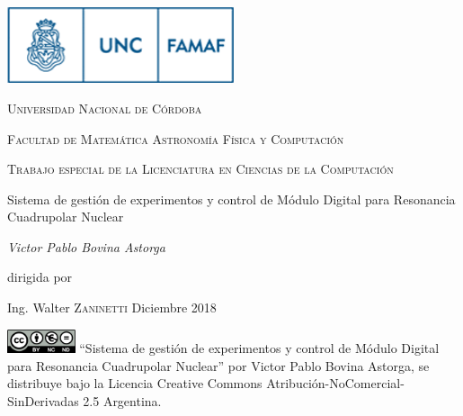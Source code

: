 

\begin{titlepage}
	\centering
	\includegraphics[width=0.50\textwidth]{../figures/famaf-logo.png}\par\vspace{1cm}
    {\scshape\LARGE Universidad Nacional de C\'ordoba \par}
    {\scshape\LARGE Facultad de Matem\'atica Astronom\'ia F\'isica y Computaci\'on \par}
	\vspace{1cm}
	{\scshape\Large Trabajo especial de la Licenciatura en
    Ciencias de la Computaci\'on\par}
	\vspace{1.5cm}
	{\huge Sistema de gesti\'on de experimentos y control de M\'odulo Digital para Resonancia Cuadrupolar Nuclear\par}
	\vspace{2cm}
	{\Large\itshape Victor Pablo Bovina Astorga\par}
	\vfill
    dirigida por \par 
    Ing. Walter \textsc{Zaninetti}
    \vfill
    Diciembre 2018
    \vfill

\href{http://creativecommons.org/licenses/by-nc-nd/2.5/ar/}{\includegraphics[width=0.15\textwidth]{../figures/cc.png}}
\vfill
{\tiny \enquote{Sistema de gesti\'on de experimentos y control de M\'odulo Digital para Resonancia Cuadrupolar Nuclear} por Victor Pablo Bovina Astorga, se distribuye bajo la Licencia Creative Commons
Atribución-NoComercial-SinDerivadas 2.5 Argentina.}

\end{titlepage}
